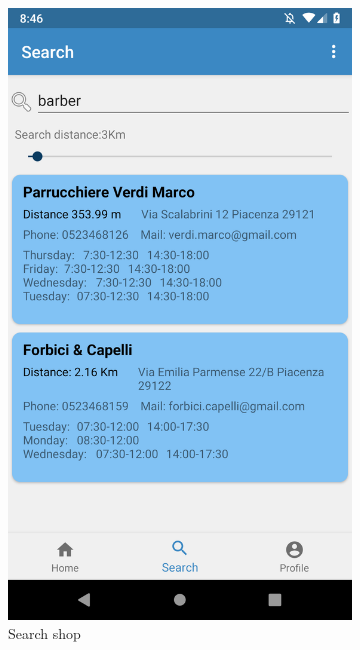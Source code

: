 \begin{figure}[h]
\centering
\begin{subfigure}{.5\textwidth}
  \centering
  \includegraphics[height=.4\textheight, keepaspectratio=true]{Img/Screens/Customer_Search}
  \caption{Search shop}
\end{subfigure}%
\begin{subfigure}{.5\textwidth}
  \centering

\end{subfigure}
\end{figure}
